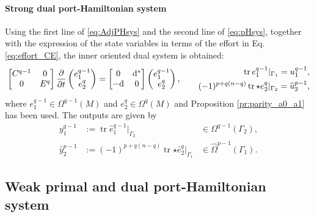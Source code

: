 \documentclass{elsarticle}
\renewcommand\d{\ensuremath{\mathrm{d}}}
\DeclareMathOperator{\tr}{tr}
\newcommand*{\dual}[1]{\ensuremath{\widehat{#1}}}
\begin{document}
{\paragraph{Strong dual port-Hamiltonian system}
Using the first line of \eqref{eq:AdjPHsys} and the second line of \eqref{eq:pHsys}, together with the expression of the state variables in terms of the effort in Eq. \eqref{eq:effort_CE}, the inner oriented dual system is obtained: 
\begin{equation}\label{eq:strong_dualPH}
    \begin{bmatrix}
        {C}^{q-1} & 0 \\
        0 & {E}^{q}
    \end{bmatrix}
    \diffp{}{t}\begin{pmatrix}
        {e}^{q-1}_1 \\
        {e}^{q}_2 
    \end{pmatrix} =
    \begin{bmatrix}
        0 & \d^* \\
        -\d & 0\\
    \end{bmatrix}
    \begin{pmatrix}
        {e}^{q-1}_1 \\
        {e}^{q}_2 
    \end{pmatrix}, \qquad
    \begin{aligned}
        \tr {e}_1^{q-1}|_{\Gamma_1} = u_1^{q-1}, \\
        (-1)^{p+q(n-q)}\tr {\star {e}_2^{q}}|_{\Gamma_2} = \dual{u}_2^{p-1}, \\
    \end{aligned}
 \end{equation}
 where ${e}_1^{q-1} \in {\Omega}^{q-1}(M)$ and ${e}^{q}_2  \in {\Omega}^q(M)$ and Proposition \ref{pr:parity_a0_a1} has been used. The outputs are given by
 \begin{equation}\label{eq:y_dual}
 \begin{aligned}
      y^{q-1}_1 &:= \tr \dual{e}^{q-1}_1 \vert_{\Gamma_2} &\in \Omega^{q-1}(\Gamma_2), \\
    \dual{y}^{p-1}_2 &:= (-1)^{p+q(n-q)} \tr {\star\dual{e}^{q}_2} \vert_{\Gamma_1} &\in \dual{\Omega}^{p-1}(\Gamma_1). 
 \end{aligned}
 \end{equation}
 
 
\subsection{Weak primal and dual port-Hamiltonian system} 

}
\end{document}
